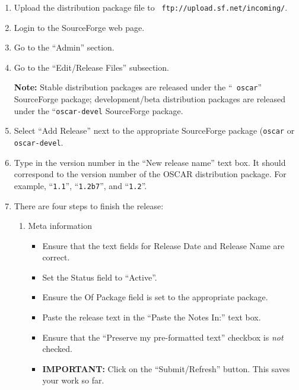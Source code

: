 \begin{enumerate}

\item Upload the distribution package file to {\tt
    ftp://upload.sf.net/incoming/}.

\item Login to the SourceForge web page.

\item Go to the ``Admin'' section.

\item Go to the ``Edit/Release Files'' subsection.

{\bf Note:} Stable distribution packages are released under the ``{\tt
  oscar}'' SourceForge package; development/beta distribution packages
  are released under the ``{\tt oscar-devel} SourceForge package.

\item Select ``Add Release'' next to the appropriate SourceForge
  package ({\tt oscar} or {\tt oscar-devel}.

\item Type in the version number in the ``New release name'' text
  box.  It should correspond to the version number of the OSCAR
  distribution package.  For example, ``{\tt 1.1}'', ``{\tt 1.2b7}'',
  and ``{\tt 1.2}''.

\item There are four steps to finish the release:

  \begin{enumerate}

    \item Meta information
      \begin{itemize}
      \item Ensure that the text fields for Release Date and Release
        Name are correct.
        
      \item Set the Status field to ``Active''.
        
      \item Ensure the Of Package field is set to the appropriate
        package.
        
      \item Paste the release text in the ``Paste the Notes In:'' text
        box.
        
      \item Ensure that the ``Preserve my pre-formatted text''
        checkbox is {\em not} checked.

      \item {\bf IMPORTANT:} Click on the ``Submit/Refresh'' button.
        This saves your work so far.
      \end{itemize}


\end{enumerate}
\end{enumerate}
